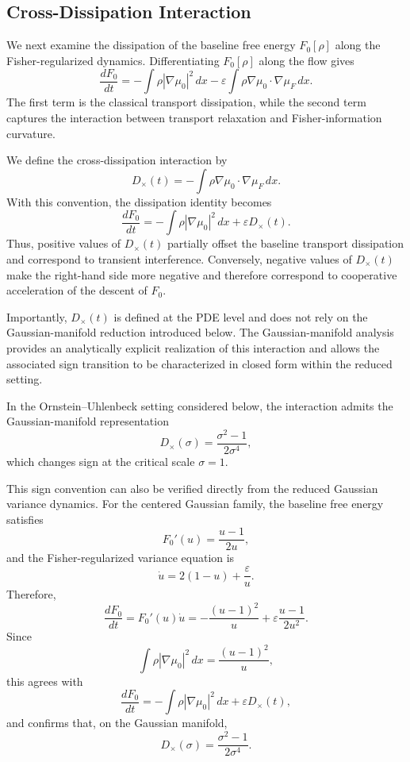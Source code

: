 \documentclass[aps,prl,twocolumn,10pt,superscriptaddress]{revtex4-2}
\begin{document}
\subsection{Cross-Dissipation Interaction}

We next examine the dissipation of the baseline free energy $F_0[\rho]$
along the Fisher-regularized dynamics. Differentiating $F_0[\rho]$ along the
flow gives
\[
\frac{dF_0}{dt}
=
-
\int
\rho |\nabla\mu_0|^2\,dx
-
\varepsilon
\int
\rho
\nabla\mu_0
\cdot
\nabla\mu_F
\,dx .
\]
The first term is the classical transport dissipation, while the second term
captures the interaction between transport relaxation and Fisher-information
curvature.

We define the cross-dissipation interaction by
\[
D_\times(t)
=
-
\int
\rho
\nabla\mu_0
\cdot
\nabla\mu_F
\,dx .
\]
With this convention, the dissipation identity becomes
\[
\frac{dF_0}{dt}
=
-
\int
\rho |\nabla\mu_0|^2\,dx
+
\varepsilon D_\times(t).
\]
Thus, positive values of $D_\times(t)$ partially offset the baseline transport
dissipation and correspond to transient interference. Conversely, negative
values of $D_\times(t)$ make the right-hand side more negative and therefore
correspond to cooperative acceleration of the descent of $F_0$.

Importantly, $D_\times(t)$ is defined at the PDE level and does not rely on
the Gaussian-manifold reduction introduced below. The Gaussian-manifold
analysis provides an analytically explicit realization of this interaction and
allows the associated sign transition to be characterized in closed form
within the reduced setting.

In the Ornstein--Uhlenbeck setting considered below, the interaction admits
the Gaussian-manifold representation
\[
D_\times(\sigma)
=
\frac{\sigma^2-1}{2\sigma^4},
\]
which changes sign at the critical scale $\sigma=1$.

This sign convention can also be verified directly from the reduced Gaussian
variance dynamics. For the centered Gaussian family, the baseline free energy
satisfies
\[
F_0'(u)
=
\frac{u-1}{2u},
\]
and the Fisher-regularized variance equation is
\[
\dot u
=
2(1-u)+\frac{\varepsilon}{u}.
\]
Therefore,
\[
\frac{dF_0}{dt}
=
F_0'(u)\dot u
=
-\frac{(u-1)^2}{u}
+
\varepsilon \frac{u-1}{2u^2}.
\]
Since
\[
\int \rho |\nabla\mu_0|^2\,dx
=
\frac{(u-1)^2}{u},
\]
this agrees with
\[
\frac{dF_0}{dt}
=
-
\int
\rho |\nabla\mu_0|^2\,dx
+
\varepsilon D_\times(t),
\]
and confirms that, on the Gaussian manifold,
\[
D_\times(\sigma)
=
\frac{\sigma^2-1}{2\sigma^4}.
\]
\end{document}
